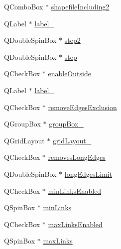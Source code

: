 \begin{DoxyCompactItemize}
\item 
Q\+Combo\+Box $\ast$ \mbox{\hyperlink{class_ui___create_graph_dialog_a492d1957e6e1a8967593466eee7d5310}{shapefile\+Including2}}
\item 
Q\+Label $\ast$ \mbox{\hyperlink{class_ui___create_graph_dialog_a2fa7e96e014f385930bc7b2ac7f45818}{label\+\_}}
\item 
Q\+Double\+Spin\+Box $\ast$ \mbox{\hyperlink{class_ui___create_graph_dialog_a60fabb11606d1d2137388a891182cb52}{step2}}
\item 
Q\+Double\+Spin\+Box $\ast$ \mbox{\hyperlink{class_ui___create_graph_dialog_a126f1fb52676e0fe9028439b92870c92}{step}}
\item 
Q\+Check\+Box $\ast$ \mbox{\hyperlink{class_ui___create_graph_dialog_a9224d8c38e5d01805e3f78a80717127a}{enable\+Outside}}
\item 
Q\+Label $\ast$ \mbox{\hyperlink{class_ui___create_graph_dialog_a11ac5780ecd5551ca767a0898b5152fa}{label\+\_}}
\item 
Q\+Check\+Box $\ast$ \mbox{\hyperlink{class_ui___create_graph_dialog_acc44e1b972ca3059c56cd03602a1f9d0}{remove\+Edges\+Exclusion}}
\item 
Q\+Group\+Box $\ast$ \mbox{\hyperlink{class_ui___create_graph_dialog_aa2d66c78303e54a575d7224107030867}{group\+Box\+\_}}
\item 
Q\+Grid\+Layout $\ast$ \mbox{\hyperlink{class_ui___create_graph_dialog_adec00aa55670e8db0efe36642dad05c0}{grid\+Layout\+\_}}
\item 
Q\+Check\+Box $\ast$ \mbox{\hyperlink{class_ui___create_graph_dialog_a691a6e818a773c2ed4cc6a7ff8376236}{removes\+Long\+Edges}}
\item 
Q\+Double\+Spin\+Box $\ast$ \mbox{\hyperlink{class_ui___create_graph_dialog_a74a01f3cb37183611c21b3bf359f6fba}{long\+Edges\+Limit}}
\item 
Q\+Check\+Box $\ast$ \mbox{\hyperlink{class_ui___create_graph_dialog_ae5fef8b2da39c9b04e88bdc6dbb1028b}{min\+Links\+Enabled}}
\item 
Q\+Spin\+Box $\ast$ \mbox{\hyperlink{class_ui___create_graph_dialog_afbaf2e948fe35157ca5b8a601a12193a}{min\+Links}}
\item 
Q\+Check\+Box $\ast$ \mbox{\hyperlink{class_ui___create_graph_dialog_a8dfe24e43411ae7196dff27b37e3056b}{max\+Links\+Enabled}}
\item 
Q\+Spin\+Box $\ast$ \mbox{\hyperlink{class_ui___create_graph_dialog_a6b16e6164c2c00cb6ad582a94383b63b}{max\+Links}}
\end{DoxyCompactItemize}


